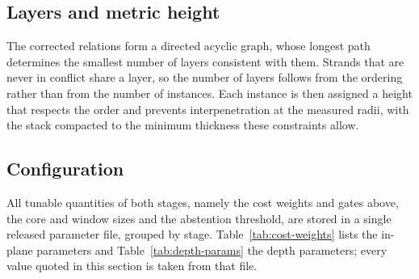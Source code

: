 \subsection{Layers and metric height}

The corrected relations form a directed acyclic graph, whose longest path
determines the smallest number of layers consistent with them. Strands that
are never in conflict share a layer, so the number of layers follows from the
ordering rather than from the number of instances. Each instance is then
assigned a height that respects the order and prevents interpenetration at the
measured radii, with the stack compacted to the minimum thickness these
constraints allow.

\subsection{Configuration}

All tunable quantities of both stages, namely the cost weights and gates
above, the core and window sizes and the abstention threshold, are stored in a
single released parameter file, grouped
by stage. Table~\ref{tab:cost-weights} lists the in-plane parameters and
Table~\ref{tab:depth-params} the depth parameters; every value quoted in this
section is taken from that file.

\begin{table}[tbp]
  \centering
  \caption{Depth-stage entries of the released parameter file. The abstention
  threshold is in score units, and the core length is fixed, so no strand
  radius enters the evidence.}
  \label{tab:depth-params}
  
\end{table}
